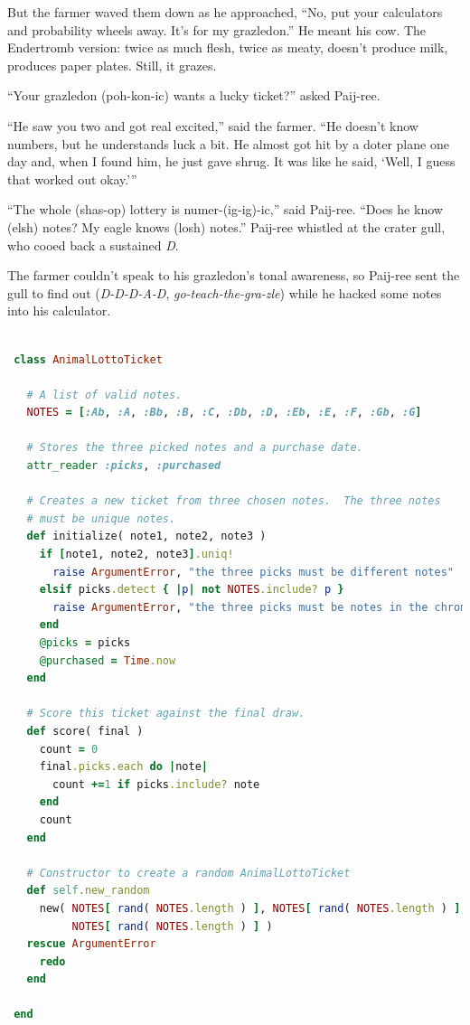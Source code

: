\documentclass[10pt,twoside]{report}
\begin{document}
But the farmer waved them down as he approached, ``No, put your
calculators and probability wheels away.  It's for my grazledon.''  He
meant his cow.  The Endertromb version: twice as much flesh, twice as
meaty, doesn't produce milk, produces paper plates.  Still, it grazes.

``Your grazledon (poh-kon-ic) wants a lucky ticket?'' asked Paij-ree.

``He saw you two and got real excited,'' said the farmer.  ``He
doesn't know numbers, but he understands luck a bit.  He almost got
hit by a doter plane one day and, when I found him, he just gave
shrug.  It was like he said, `Well, I guess that worked out okay.'''

``The whole (shas-op) lottery is numer-(ig-ig)-ic,'' said Paij-ree.
``Does he know (elsh) notes?  My eagle knows (losh) notes.''  Paij-ree
whistled at the crater gull, who cooed back a sustained {\em D}.

The farmer couldn't speak to his grazledon's tonal awareness, so
Paij-ree sent the gull to find out ({\em D-D-D-A-D}, {\em
  go-teach-the-gra-zle}) while he hacked some notes into his
calculator.


\begin{lstlisting}[basicstyle=\ttfamily\color{basiccolor},
    commentstyle = \ttfamily\color{commentcolor},
    keywordstyle=\ttfamily\color{keywordscolor},
    stringstyle=\color{stringcolor},
    language=Ruby,
    basicstyle=\small\ttfamily,
    showstringspaces=false,
  ]

 class AnimalLottoTicket

   # A list of valid notes.
   NOTES = [:Ab, :A, :Bb, :B, :C, :Db, :D, :Eb, :E, :F, :Gb, :G]

   # Stores the three picked notes and a purchase date.
   attr_reader :picks, :purchased

   # Creates a new ticket from three chosen notes.  The three notes
   # must be unique notes.
   def initialize( note1, note2, note3 )
     if [note1, note2, note3].uniq!
       raise ArgumentError, "the three picks must be different notes"
     elsif picks.detect { |p| not NOTES.include? p }
       raise ArgumentError, "the three picks must be notes in the chromatic scale."
     end
     @picks = picks
     @purchased = Time.now
   end

   # Score this ticket against the final draw.
   def score( final )
     count = 0
     final.picks.each do |note|
       count +=1 if picks.include? note
     end
     count
   end

   # Constructor to create a random AnimalLottoTicket
   def self.new_random
     new( NOTES[ rand( NOTES.length ) ], NOTES[ rand( NOTES.length ) ],
          NOTES[ rand( NOTES.length ) ] )
   rescue ArgumentError
     redo
   end

 end

\end{lstlisting}
\end{document}
